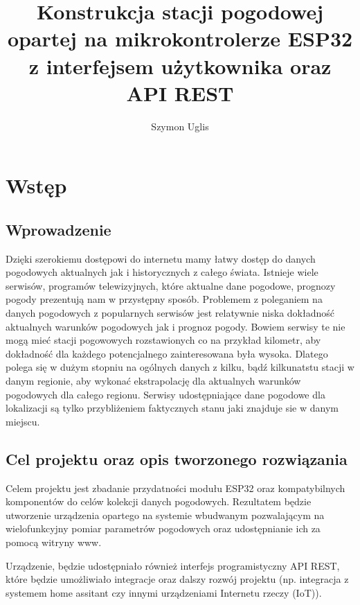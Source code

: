 \documentclass[12pt,a4paper]{article}
\title{Konstrukcja stacji pogodowej opartej na mikrokontrolerze ESP32 z interfejsem użytkownika oraz API REST}
\author{Szymon Uglis}
\begin{document}
\justifying

\nocite{*}

\begin{titlepage}
    
\end{titlepage}

\tableofcontents{}
\pagebreak

\section{Wstęp}

\subsection{Wprowadzenie}

Dzięki szerokiemu dostępowi do internetu mamy łatwy dostęp do danych pogodowych aktualnych jak i historycznych z całego świata. Istnieje wiele
serwisów, programów telewizyjnych, które aktualne dane pogodowe, prognozy pogody prezentują nam w przystępny sposób.
Problemem z poleganiem na danych pogodowych z popularnych serwisów jest relatywnie niska dokładność aktualnych warunków pogodowych jak i prognoz pogody.
Bowiem serwisy te nie mogą mieć stacji pogowowych rozstawionych co na przykład kilometr, aby dokładność dla każdego potencjalnego zainteresowana była wysoka.
Dlatego polega się w dużym stopniu na ogólnych danych z kilku, bądź kilkunatstu stacji w danym regionie, aby wykonać ekstrapolację dla
aktualnych warunków pogodowych dla całego regionu. 
Serwisy udostępniające dane pogodowe dla lokalizacji są tylko przybliżeniem faktycznych stanu jaki znajduje sie w danym miejscu. 

\subsection{Cel projektu oraz opis tworzonego rozwiązania}

Celem projektu jest zbadanie przydatności modułu ESP32 oraz kompatybilnych komponentów do celów kolekcji danych pogodowych. 
Rezultatem będzie utworzenie urządzenia opartego na systemie wbudwanym pozwalającym na wielofunkcyjny pomiar parametrów pogodowych oraz udostępnianie ich za pomocą witryny www.

Urządzenie, będzie udostępniało również interfejs programistyczny API REST, które będzie umożliwiało integracje oraz dalszy rozwój projektu 
(np. integracja z systemem home assitant czy innymi urządzeniami Internetu rzeczy (IoT)).
\end{document}
